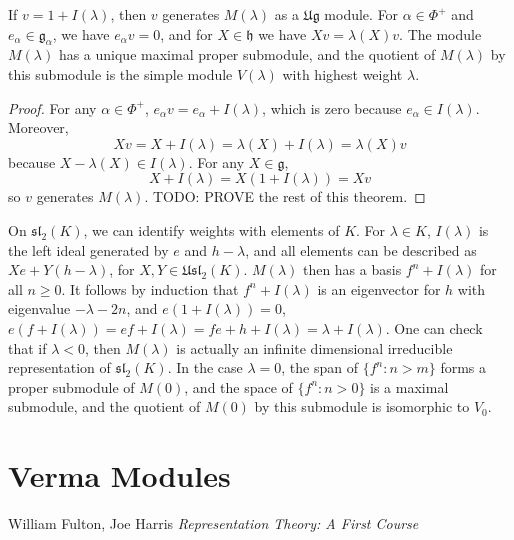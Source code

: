 \begin{theorem}
    If $v = 1 + I(\lambda)$, then $v$ generates $M(\lambda)$ as a $\mathfrak{Ug}$ module. For $\alpha \in \Phi^+$ and $e_\alpha \in \mathfrak{g}_\alpha$, we have $e_\alpha v = 0$, and for $X \in \mathfrak{h}$ we have $Xv = \lambda(X)v$. The module $M(\lambda)$ has a unique maximal proper submodule, and the quotient of $M(\lambda)$ by this submodule is the simple module $V(\lambda)$ with highest weight $\lambda$.
\end{theorem}
\begin{proof}
    For any $\alpha \in \Phi^+$, $e_\alpha v = e_\alpha + I(\lambda)$, which is zero because $e_\alpha \in I(\lambda)$. Moreover,
    \[ Xv = X + I(\lambda) = \lambda(X) + I(\lambda) = \lambda(X)v \]
    because $X - \lambda(X) \in I(\lambda)$. For any $X \in \mathfrak{g}$,
    \[ X + I(\lambda) = X(1 + I(\lambda)) = Xv \]
    so $v$ generates $M(\lambda)$. TODO: PROVE the rest of this theorem.
\end{proof}

\begin{example}
    On $\mathfrak{sl}_2(K)$, we can identify weights with elements of $K$. For $\lambda \in K$, $I(\lambda)$ is the left ideal generated by $e$ and $h - \lambda$, and all elements can be described as $Xe + Y(h - \lambda)$, for $X,Y \in \mathfrak{Usl}_2(K)$. $M(\lambda)$ then has a basis $f^n + I(\lambda)$ for all $n \geq 0$. It follows by induction that $f^n + I(\lambda)$ is an eigenvector for $h$ with eigenvalue $-\lambda-2n$, and $e(1 + I(\lambda)) = 0$, $e(f + I(\lambda)) = ef + I(\lambda) = fe + h + I(\lambda) = \lambda + I(\lambda)$. One can check that if $\lambda < 0$, then $M(\lambda)$ is actually an infinite dimensional irreducible representation of $\mathfrak{sl}_2(K)$. In the case $\lambda = 0$, the span of $\{ f^n : n > m \}$ forms a proper submodule of $M(0)$, and the space of $\{ f^n : n > 0 \}$ is a maximal submodule, and the quotient of $M(0)$ by this submodule is isomorphic to $V_0$.
\end{example}














\chapter{Verma Modules}








\begin{thebibliography}{9}

William Fulton, Joe Harris
\textit{Representation Theory: A First Course}

\end{thebibliography}

